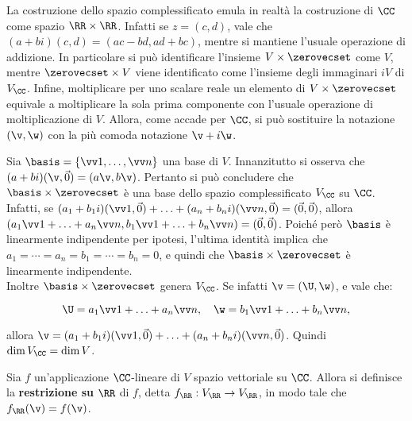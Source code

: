 \begin{remark}
	La costruzione dello spazio complessificato emula in realtà la costruzione di $\CC$ come spazio
	$\RR \times \RR$. Infatti se $z = (c, d)$, vale che $(a + bi)(c, d) = (ac - bd, ad + bc)$, mentre
	si mantiene l'usuale operazione di addizione. In particolare si può identificare l'insieme
	$V \times \zerovecset$ come $V$, mentre $\zerovecset \times V$ viene identificato come l'insieme
	degli immaginari $iV$ di $V_\CC$. Infine, moltiplicare per uno scalare reale un elemento di
	$V \times \zerovecset$ equivale a moltiplicare la sola prima componente con l'usuale operazione
	di moltiplicazione di $V$. Allora, come accade per $\CC$, si può sostituire la notazione
	$(\v, \w)$ con la più comoda notazione $\v + i \w$.
\end{remark}

\begin{remark}
	Sia $\basis = \{ \vv 1, \ldots, \vv n \}$ una base di $V$. Innanzitutto si osserva che
	$(a+bi)(\v, \vec 0) = (a\v, b\v)$. Pertanto si può concludere che $\basis \times \zerovecset$ è
	una base dello spazio complessificato $V_\CC$ su $\CC$. \\
	
	Infatti, se $(a_1 + b_1 i)(\vv 1, \vec 0) + \ldots + (a_n + b_n i)(\vv n, \vec 0) = (\vec 0, \vec 0)$,
	allora $(a_1 \vv 1 + \ldots + a_n \vv n, b_1 \vv 1 + \ldots + b_n \vv n) = (\vec 0, \vec 0)$.
	Poiché però $\basis$ è linearmente indipendente per ipotesi, l'ultima identità implica che
	$a_1 = \cdots = a_n = b_1 = \cdots = b_n = 0$, e quindi che $\basis \times \zerovecset$ è linearmente
	indipendente. \\
	
	Inoltre $\basis \times \zerovecset$ genera $V_\CC$. Se infatti $\v = (\U, \w)$, e vale che:
	
	\[ \U = a_1 \vv 1 + \ldots + a_n \vv n, \quad \w = b_1 \vv 1 + \ldots + b_n \vv n, \]
	
	\vskip 0.1in
	
	allora $\v = (a_1 + b_1 i) (\vv 1, \vec 0) + \ldots + (a_n + b_n i) (\vv n, \vec 0)$. Quindi
	$\dim V_\CC = \dim V$.
\end{remark}

\begin{definition}
	Sia $f$ un'applicazione $\CC$-lineare di $V$ spazio vettoriale su $\CC$. Allora
	si definisce la \textbf{restrizione su} $\RR$ di $f$, detta $f_\RR : V_\RR \to V_\RR$,
	in modo tale che $f_\RR(\v) = f(\v)$.
\end{definition}

